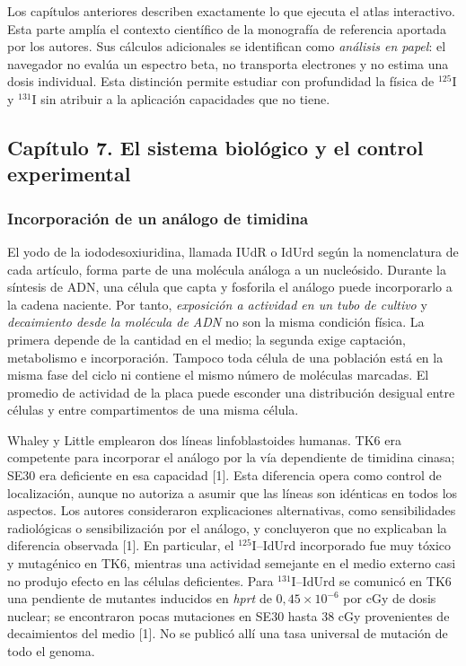 \documentclass[11pt,a4paper,oneside]{article}
\begin{document}
Los capítulos anteriores describen exactamente lo que ejecuta el atlas interactivo.
Esta parte amplía el contexto científico de la monografía de referencia aportada por
los autores. Sus cálculos adicionales se identifican como \emph{análisis en papel}:
el navegador no evalúa un espectro beta, no transporta electrones y no estima una
dosis individual. Esta distinción permite estudiar con profundidad la física de
$^{125}$I y $^{131}$I sin atribuir a la aplicación capacidades que no tiene.

\subsection{Capítulo 7. El sistema biológico y el control experimental}
\label{ampliacion-sistema}

\subsubsection{Incorporación de un análogo de timidina}
El yodo de la iododesoxiuridina, llamada IUdR o IdUrd según la nomenclatura de
cada artículo, forma parte de una molécula análoga a un nucleósido. Durante la
síntesis de ADN, una célula que capta y fosforila el análogo puede incorporarlo
a la cadena naciente. Por tanto, \emph{exposición a actividad en un tubo de cultivo}
y \emph{decaimiento desde la molécula de ADN} no son la misma condición física.
La primera depende de la cantidad en el medio; la segunda exige captación,
metabolismo e incorporación. Tampoco toda célula de una población está en la
misma fase del ciclo ni contiene el mismo número de moléculas marcadas. El
promedio de actividad de la placa puede esconder una distribución desigual entre
células y entre compartimentos de una misma célula.

Whaley y Little emplearon dos líneas linfoblastoides humanas. TK6 era competente
para incorporar el análogo por la vía dependiente de timidina cinasa; SE30 era
deficiente en esa capacidad [1]. Esta diferencia opera como control de
localización, aunque no autoriza a asumir que las líneas son idénticas en todos
los aspectos. Los autores consideraron explicaciones alternativas, como
sensibilidades radiológicas o sensibilización por el análogo, y concluyeron que
no explicaban la diferencia observada [1]. En particular, el $^{125}$I--IdUrd
incorporado fue muy tóxico y mutagénico en TK6, mientras una actividad semejante
en el medio externo casi no produjo efecto en las células deficientes. Para
$^{131}$I--IdUrd se comunicó en TK6 una pendiente de mutantes inducidos en
\emph{hprt} de $0,45\times10^{-6}$ por cGy de dosis nuclear; se encontraron
pocas mutaciones en SE30 hasta 38 cGy provenientes de decaimientos del medio
[1]. No se publicó allí una tasa universal de mutación de todo el genoma.
\end{document}
